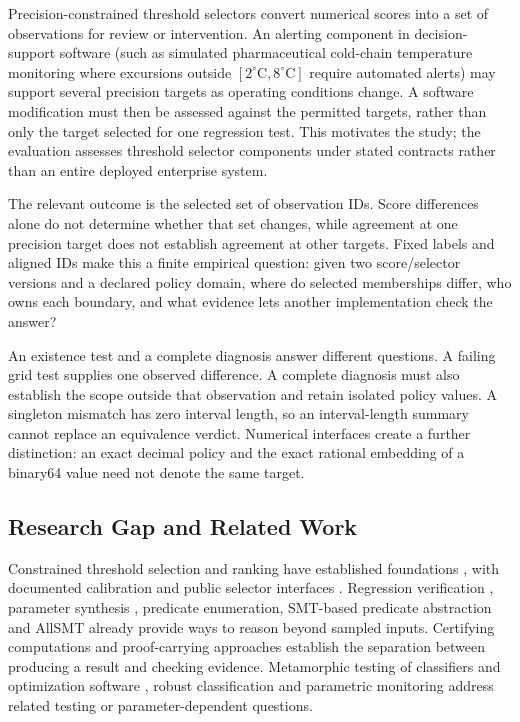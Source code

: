 \documentclass[11pt,a4paper]{article}
\begin{document}
Precision-constrained threshold selectors convert numerical scores into a set of observations for review or intervention. An alerting component in decision-support software (such as simulated pharmaceutical cold-chain temperature monitoring where excursions outside $[2^\circ\text{C}, 8^\circ\text{C}]$ require automated alerts) may support several precision targets as operating conditions change. A software modification must then be assessed against the permitted targets, rather than only the target selected for one regression test. This motivates the study; the evaluation assesses threshold selector components under stated contracts rather than an entire deployed enterprise system.

The relevant outcome is the selected set of observation IDs. Score differences alone do not determine whether that set changes, while agreement at one precision target does not establish agreement at other targets. Fixed labels and aligned IDs make this a finite empirical question: given two score/selector versions and a declared policy domain, where do selected memberships differ, who owns each boundary, and what evidence lets another implementation check the answer?

An existence test and a complete diagnosis answer different questions. A failing grid test supplies one observed difference. A complete diagnosis must also establish the scope outside that observation and retain isolated policy values. A singleton mismatch has zero interval length, so an interval-length summary cannot replace an equivalence verdict. Numerical interfaces create a further distinction: an exact decimal policy and the exact rational embedding of a binary64 value need not denote the same target.


\subsection{Research Gap and Related Work}

Constrained threshold selection and ranking have established foundations \cite{rath2022optimizing,mackey2018constrained,tasche2018plugin}, with documented calibration and public selector interfaces \cite{sklearn_calibrated,sklearn_tuned,behring2026evaltoolkit}. Regression verification \cite{godlin2009regression}, parameter synthesis \cite{storm2026parametric,junges2024parameter,dehnert2015prophesy}, predicate enumeration, SMT-based predicate abstraction and AllSMT \cite{mathsat_api,morettin2017efficient,spallitta2025disjoint} already provide ways to reason beyond sampled inputs. Certifying computations \cite{alkassar2013framework,mcconnell2011certifying} and proof-carrying approaches \cite{necula2002proof} establish the separation between producing a result and checking evidence. Metamorphic testing of classifiers and optimization software \cite{duquetorres2025assessing,yang2021towards,xie2011testing}, robust classification \cite{provost2001robust} and parametric monitoring \cite{chen2009parametric} address related testing or parameter-dependent questions.
\end{document}
